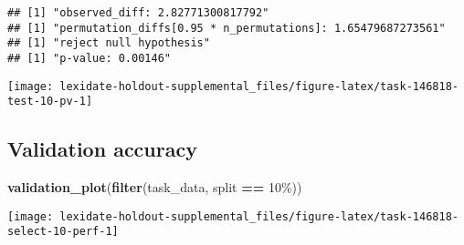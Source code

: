 \documentclass[
]{book}
\newenvironment{Shaded}{\begin{snugshade}}{\end{snugshade}}
\newcommand{\AttributeTok}[1]{\textcolor[rgb]{0.13,0.29,0.53}{#1}}
\newcommand{\DecValTok}[1]{\textcolor[rgb]{0.00,0.00,0.81}{#1}}
\newcommand{\FunctionTok}[1]{\textcolor[rgb]{0.13,0.29,0.53}{\textbf{#1}}}
\newcommand{\NormalTok}[1]{#1}
\newcommand{\OtherTok}[1]{\textcolor[rgb]{0.56,0.35,0.01}{#1}}
\newcommand{\SpecialCharTok}[1]{\textcolor[rgb]{0.81,0.36,0.00}{\textbf{#1}}}
\newcommand{\StringTok}[1]{\textcolor[rgb]{0.31,0.60,0.02}{#1}}
\begin{document}
\begin{Shaded}
\end{Shaded}

\begin{verbatim}
## [1] "observed_diff: 2.82771300817792"
## [1] "permutation_diffs[0.95 * n_permutations]: 1.65479687273561"
## [1] "reject null hypothesis"
## [1] "p-value: 0.00146"
\end{verbatim}

\texttt{[image: lexidate-holdout-supplemental\_files/figure-latex/task-146818-test-10-pv-1]}

\hypertarget{validation-accuracy-1}{%
\subsection{Validation accuracy}\label{validation-accuracy-1}}

\begin{Shaded}
\begin{Highlighting}[]
\FunctionTok{validation\_plot}\NormalTok{(}\FunctionTok{filter}\NormalTok{(task\_data, split }\SpecialCharTok{==} \StringTok{\textquotesingle{}10\%\textquotesingle{}}\NormalTok{))}
\end{Highlighting}
\end{Shaded}

\texttt{[image: lexidate-holdout-supplemental\_files/figure-latex/task-146818-select-10-perf-1]}
\end{document}
